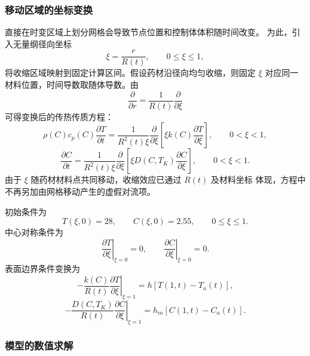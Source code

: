 \documentclass[12pt,a4paper]{article}
\begin{document}
\subsubsection{移动区域的坐标变换}

直接在时变区域上划分网格会导致节点位置和控制体体积随时间改变。
为此，引入无量纲径向坐标
\begin{equation}
\xi=\frac{r}{R(t)},\qquad 0\leq\xi\leq1,
\label{eq:q4-coordinate}
\end{equation}
将收缩区域映射到固定计算区间。假设药材沿径向均匀收缩，则固定
$\xi$ 对应同一材料位置，时间导数取随体导数。由
\begin{equation}
\frac{\partial}{\partial r}
=\frac{1}{R(t)}\frac{\partial}{\partial\xi}
\end{equation}
可得变换后的传热传质方程：
\begin{equation}
\rho(C)c_p(C)\frac{\partial T}{\partial t}
=\frac{1}{R^2(t)\xi}
\frac{\partial}{\partial\xi}
\left[\xi k(C)\frac{\partial T}{\partial\xi}\right],
\qquad 0<\xi<1,
\label{eq:q4-heat}
\end{equation}
\begin{equation}
\frac{\partial C}{\partial t}
=\frac{1}{R^2(t)\xi}
\frac{\partial}{\partial\xi}
\left[\xi D(C,T_K)\frac{\partial C}{\partial\xi}\right],
\qquad 0<\xi<1.
\label{eq:q4-moisture}
\end{equation}
由于 $\xi$ 随药材材料点共同移动，收缩效应已通过 $R(t)$ 及材料坐标
体现，方程中不再另加由网格移动产生的虚假对流项。

初始条件为
\begin{equation}
T(\xi,0)=28,\qquad C(\xi,0)=2.55,
\qquad 0\leq\xi\leq1.
\label{eq:q4-initial}
\end{equation}
中心对称条件为
\begin{equation}
\left.\frac{\partial T}{\partial\xi}\right|_{\xi=0}=0,
\qquad
\left.\frac{\partial C}{\partial\xi}\right|_{\xi=0}=0.
\label{eq:q4-center}
\end{equation}
表面边界条件变换为
\begin{equation}
-\frac{k(C)}{R(t)}
\left.\frac{\partial T}{\partial\xi}\right|_{\xi=1}
=h[T(1,t)-T_a(t)],
\label{eq:q4-heat-bc}
\end{equation}
\begin{equation}
-\frac{D(C,T_K)}{R(t)}
\left.\frac{\partial C}{\partial\xi}\right|_{\xi=1}
=h_m[C(1,t)-C_a(t)].
\label{eq:q4-moisture-bc}
\end{equation}

\subsubsection{模型的数值求解}
\end{document}
